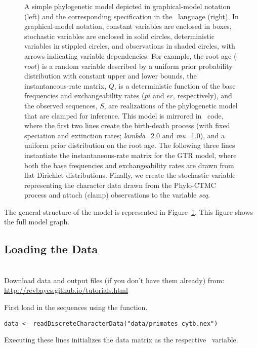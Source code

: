 \begin{figure}[h!]
\centering
{}
\caption{\small A simple phylogenetic model depicted in graphical-model notation (left) and the corresponding specification in the \Rev~language (right).
In graphical-model notation, constant variables are enclosed in boxes, stochastic variables are enclosed in solid circles, deterministic variables in stippled circles, and observations in shaded circles, with arrows indicating variable dependencies. 
For example, the root age ($root$) is a random variable described by a uniform prior probability distribution with constant upper and lower bounds, the instantaneous-rate matrix, $Q$, is a deterministic function of the base frequencies and exchangeability rates ($pi$ and $er$, respectively), and the observed sequences, $S$, are realizations of the phylogenetic model that are clamped for inference. 
This model is mirrored in \Rev~code, where the first two lines create the birth-death process (with fixed speciation and extinction rates; \emph{lambda}=2.0 and \emph{mu}=1.0), and a uniform prior distribution on the root age. 
The following three lines instantiate the instantaneous-rate matrix for the GTR model, where both the base frequencies and exchangeability rates are drawn from flat Dirichlet distributions.
Finally, we create the stochastic variable representing the character data drawn from the Phylo-CTMC  process and attach (clamp) observations to the variable \emph{seq}.}
\label{fig:clock_prior}
\end{figure}

The general structure of the model is represented in Figure~\ref{fig:clock_prior}.
This figure shows the full model graph.


\bigskip

\subsection{Loading the Data}

\noindent \\ \impmark Download data and output files (if you don't have them already) from: \href{http://revbayes.github.io/tutorials.html}{http://revbayes.github.io/tutorials.html}

First load in the sequences using the  function. 
{\tt \begin{snugshade*}
\begin{lstlisting}
data <- readDiscreteCharacterData("data/primates_cytb.nex")
\end{lstlisting}
\end{snugshade*}}
Executing these lines initializes the data matrix as the respective \Rev~variable. 

